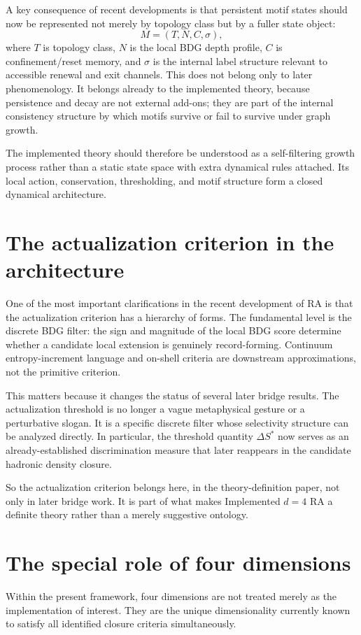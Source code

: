 \documentclass[11pt]{article}
\begin{document}
A key consequence of recent developments is that persistent motif states should now be represented not merely by topology class but by a fuller state object:
\[
M=(T,N,C,\sigma),
\]
where $T$ is topology class, $N$ is the local BDG depth profile, $C$ is confinement/reset memory, and $\sigma$ is the internal label structure relevant to accessible renewal and exit channels. This does not belong only to later phenomenology. It belongs already to the implemented theory, because persistence and decay are not external add-ons; they are part of the internal consistency structure by which motifs survive or fail to survive under graph growth.

The implemented theory should therefore be understood as a self-filtering growth process rather than a static state space with extra dynamical rules attached. Its local action, conservation, thresholding, and motif structure form a closed dynamical architecture.

\section{The actualization criterion in the architecture}\label{sec:actualization}
One of the most important clarifications in the recent development of RA is that the actualization criterion has a hierarchy of forms. The fundamental level is the discrete BDG filter: the sign and magnitude of the local BDG score determine whether a candidate local extension is genuinely record-forming. Continuum entropy-increment language and on-shell criteria are downstream approximations, not the primitive criterion.

This matters because it changes the status of several later bridge results. The actualization threshold is no longer a vague metaphysical gesture or a perturbative slogan. It is a specific discrete filter whose selectivity structure can be analyzed directly. In particular, the threshold quantity $\Delta S^*$ now serves as an already-established discrimination measure that later reappears in the candidate hadronic density closure.

So the actualization criterion belongs here, in the theory-definition paper, not only in later bridge work. It is part of what makes Implemented $d=4$ RA a definite theory rather than a merely suggestive ontology.

\section{The special role of four dimensions}\label{sec:d4}
Within the present framework, four dimensions are not treated merely as the implementation of interest. They are the unique dimensionality currently known to satisfy all identified closure criteria simultaneously.
\end{document}
